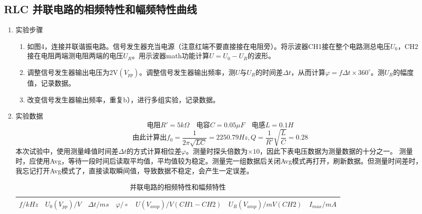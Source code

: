 \documentclass[UTF8]{article}
\begin{document}
\subsection{RLC 并联电路的相频特性和幅频特性曲线}
\begin{enumerate}
    \item 实验步骤
    \begin{enumerate}
        \item 如图4，连接并联谐振电路。信号发生器充当电源（注意红端不要直接接在电阻旁）。将示波器CH1接在整个电路测总电压$U_0$，CH2接在电阻两端测电阻两端的电压$U_R$。用示波器math功能计算$U=U_0-U_R$的波形。
        \item 调整信号发生器输出电压为2V$(V_{pp})$。调整信号发生器输出频率，测$U$与$U_R$的时间差$\Delta t$，从而计算$\varphi=f\Delta t\times 360^\circ$。测$U_R$的幅度值，记录数据。
        \item 改变信号发生器输出频率，重复b），进行多组实验，记录数据。
    \end{enumerate}
    \item 实验数据
    \[\text{电阻}R'=5k\Omega \quad \text{电容}C=0.05\mu F \quad \text{电感}L=0.1H \]
    \[\text{由此计算出}f_0=\frac{1}{2\pi\sqrt{LC}}=2250.79Hz,Q=\frac{1}{R'}\sqrt{\frac{L}{C}}=0.28\]
    \hspace*{2em} 本次试验中，使用测量峰值时间差$\Delta t$的方式计算相位差$\varphi$。测量时探头倍数为$\times 10$，因此下表电压数据为测量数据的十分之一。
    \newline \hspace*{2em}测量时，应使用Avg，等待一段时间后读取平均值，平均值较为稳定。测量完一组数据后关闭Avg模式再打开，刷新数据。但测量时间差时，我忘记打开Avg模式了，直接读取瞬间值，导致数据不稳定，会产生一定误差。


        \begin{table}[htbp]
          \centering
          \caption{并联电路的相频特性和幅频特性}
            \begin{tabular}{|r|r|r|r|r|r|r|}\hline
            $f/kHz$ & $U_0(V_{pp})/V$ & $\Delta t/ms$ & $\varphi /\circ$ & $U(V_{amp})/V(CH1-CH2)$ & $U_R(V_{amp})/mV(CH2)$ & $I_{max}/mA$ \\\hline
            

\end{tabular}
\end{table}
\end{enumerate}
\end{document}
